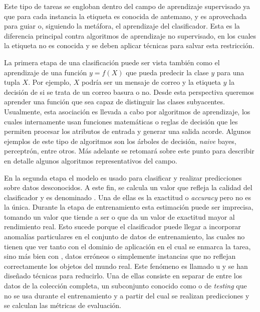 Este tipo de tareas se engloban dentro del campo de aprendizaje supervisado ya
que para cada instancia la etiqueta es conocida de antemano, y es aprovechada
para guiar o, siguiendo la metáfora,  el aprendizaje del
clasificador. Esta es la diferencia principal contra algoritmos de aprendizaje
no supervisado, en los cuales la etiqueta no es conocida y se deben aplicar
técnicas para salvar esta restricción.

La primera etapa de una clasificación puede ser vista también como el
aprendizaje de una función $y=f(X)$ que pueda predecir la clase $y$ para una
tupla $X$. Por ejemplo, $X$ podría ser un mensaje de correo y la etiqueta $y$ la
decisión de si se trata de un correo basura o no. Desde esta perspectiva
queremos aprender una función que sea capaz de distinguir las clases
subyacentes.  Usualmente, esta asociación es llevada a cabo por algoritmos de
aprendizaje, los cuales internamente usan funciones matemáticas o reglas de
decisión que les permiten procesar los atributos de entrada y generar una salida
acorde. Algunos ejemplos de este tipo de algoritmos son los árboles de decisión,
\textit{naive} bayes, perceptrón, entre otros. Más adelante se retomará sobre
este punto para describir en detalle algunos algoritmos representativos del
campo.

En la segunda etapa el modelo es usado para clasificar y realizar predicciones
sobre datos desconocidos. A este fin, se calcula un valor que refleja la calidad
del clasificador y es denominado . Una de ellas
es la exactitud o \textit{accuracy} pero no es la única.  Durante la etapa de
entrenamiento esta estimación puede ser imprecisa, tomando un valor que tiende a
ser  o que da un valor de exactitud mayor al rendimiento
real.  Esto sucede porque el clasificador puede llegar a incorporar anomalías
particulares en el conjunto de datos de entrenamiento, las cuales no tienen que
ver tanto con el dominio de aplicación en el cual se enmarca la tarea, sino más
bien con , datos erróneos o simplemente instancias que no
reflejan correctamente los objetos del mundo real. Este fenómeno es llamado
 u  y se han diseñado técnicas
para reducirlo. Una de ellas consiste en separar de entre los datos de la
colección completa, un subconjunto conocido como  o
de \textit{testing} que no se usa durante el entrenamiento y a partir del cual
se realizan predicciones y se calculan las métricas de evaluación. 

